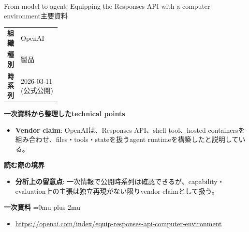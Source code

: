 \begin{technicalnote}{From model to agent: Equipping the Responses API with a computer environment}{主要資料}
\begingroup
\begin{tabularx}{\linewidth}{@{}>{\bfseries}p{0.22\linewidth}X@{}}
組織 & OpenAI \\
種別 & 製品 \\
時系列 & 2026-03-11 (公式公開) \\
\end{tabularx}
\smallskip
{\bfseries 一次資料から整理したtechnical points}
\begin{itemize}[leftmargin=1.5em,itemsep=0.35em]
\item \textbf{Vendor claim}: OpenAIは、Responses API、shell tool、hosted containersを組み合わせ、files・tools・stateを扱うagent runtimeを構築したと説明している。
\end{itemize}
\begin{minipage}{\linewidth}
{\bfseries 読む際の境界}
\begin{itemize}[leftmargin=1.5em,itemsep=0.35em]
\item \textbf{分析上の留意点}: 一次情報で公開時系列は確認できるが、capability・evaluation上の主張は独立再現がない限りvendor claimとして扱う。
\end{itemize}
\begin{samepage}
{\bfseries 一次資料}
\begingroup\sloppy
\Urlmuskip=0mu plus 2mu\relax
\begin{itemize}[leftmargin=1.5em,itemsep=0.25em]
\item {\scriptsize\url{https://openai.com/index/equip-responses-api-computer-environment}}
\end{itemize}
\endgroup
\end{samepage}
\end{minipage}
\endgroup
\end{technicalnote}
\medskip

